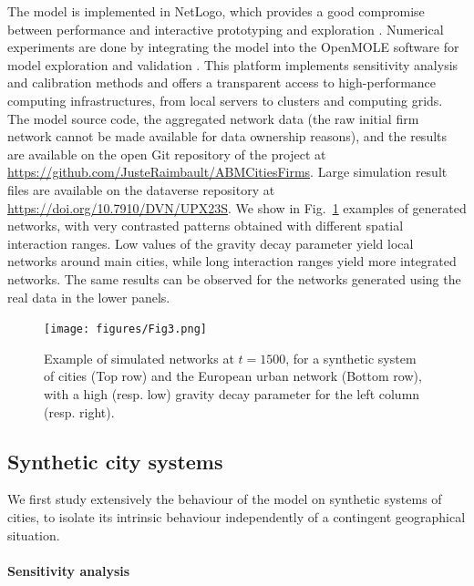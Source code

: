 \documentclass[10pt,letterpaper]{article}
\begin{document}
The model is implemented in NetLogo, which provides a good compromise between performance and interactive prototyping and exploration \cite{railsback2017improving}. Numerical experiments are done by integrating the model into the OpenMOLE software for model exploration and validation \cite{reuillon2013openmole}. This platform implements sensitivity analysis and calibration methods and offers a transparent access to high-performance computing infrastructures, from local servers to clusters and computing grids. The model source code, the aggregated network data (the raw initial firm network cannot be made available for data ownership reasons), and the results are available on the open Git repository of the project at \url{https://github.com/JusteRaimbault/ABMCitiesFirms}. Large simulation result files are available on the dataverse repository at \url{https://doi.org/10.7910/DVN/UPX23S}. We show in Fig.~\ref{fig:fig3} examples of generated networks, with very contrasted patterns obtained with different spatial interaction ranges. Low values of the gravity decay parameter yield local networks around main cities, while long interaction ranges yield more integrated networks. The same results can be observed for the networks generated using the real data in the lower panels.

\begin{figure}
    \begin{center}
        \texttt{[image: figures/Fig3.png]}
    \end{center}
    \vspace{2cm}
    \caption{Example of simulated networks at $t=1500$, for a synthetic system of cities (Top row) and the European urban network (Bottom row), with a high (resp. low) gravity decay parameter for the left column (resp. right).\label{fig:fig3}}
\end{figure}


\subsection*{Synthetic city systems}

We first study extensively the behaviour of the model on synthetic systems of cities, to isolate its intrinsic behaviour independently of a contingent geographical situation.

\paragraph{Sensitivity analysis}
\end{document}
